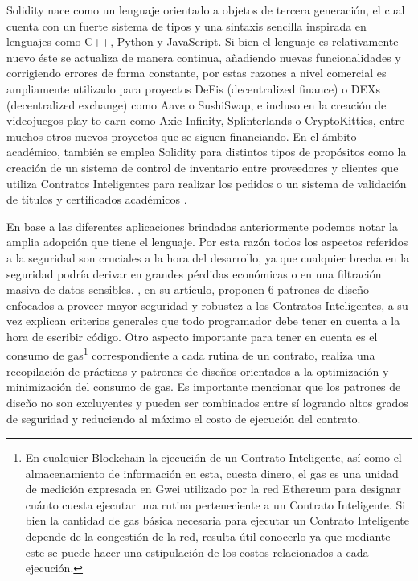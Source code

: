\documentclass[a4paper,10pt]{article}
\begin{document}
	Solidity nace como un lenguaje orientado a objetos de tercera generación, el cual cuenta con un fuerte sistema de tipos y una sintaxis sencilla inspirada en lenguajes como C++, Python y JavaScript. Si bien el lenguaje es relativamente nuevo éste se actualiza de manera continua, añadiendo nuevas funcionalidades y corrigiendo errores de forma constante, por estas razones a nivel comercial es ampliamente utilizado para proyectos DeFis (decentralized finance) o DEXs (decentralized exchange) como Aave o SushiSwap, e incluso en la creación de videojuegos play-to-earn como Axie Infinity, Splinterlands o CryptoKitties, entre muchos otros nuevos proyectos que se siguen financiando. En el ámbito académico, también se emplea Solidity para distintos tipos de propósitos como la creación de un sistema de control de inventario entre proveedores y clientes que utiliza Contratos Inteligentes para realizar los pedidos \parencite{omar2021supply} o un sistema de validación de títulos y certificados académicos \parencite{bousaba2019degree}.
	
	En base a las diferentes aplicaciones brindadas anteriormente podemos notar la amplia adopción que tiene el lenguaje. Por esta razón todos los aspectos referidos a la seguridad son cruciales a la hora del desarrollo, ya que cualquier brecha en la seguridad podría derivar en grandes pérdidas económicas o en una filtración masiva de datos sensibles. \textcite{wohrer2018smart}, en su artículo, proponen 6 patrones de diseño enfocados a proveer mayor seguridad y robustez a los Contratos Inteligentes, a su vez explican criterios generales que todo programador debe tener en cuenta a la hora de escribir código. Otro aspecto importante para tener en cuenta es el consumo de gas\footnote{En cualquier Blockchain la ejecución de un Contrato Inteligente, así como el almacenamiento de información en esta, cuesta dinero, el gas es una unidad de medición expresada en Gwei utilizado por la red Ethereum para designar cuánto cuesta ejecutar una rutina perteneciente a un Contrato Inteligente. Si bien la cantidad de gas básica necesaria para ejecutar un Contrato Inteligente depende de la congestión de la red, resulta útil conocerlo ya que mediante este se puede hacer una estipulación de los costos relacionados a cada ejecución.} correspondiente a cada rutina de un contrato, \textcite{marchesi2020design} realiza una recopilación de prácticas y patrones de diseños orientados a la optimización y minimización del consumo de gas. Es importante mencionar que los patrones de diseño no son excluyentes y pueden ser combinados entre sí logrando altos grados de seguridad y reduciendo al máximo el costo de ejecución del contrato.
	
\end{document}
